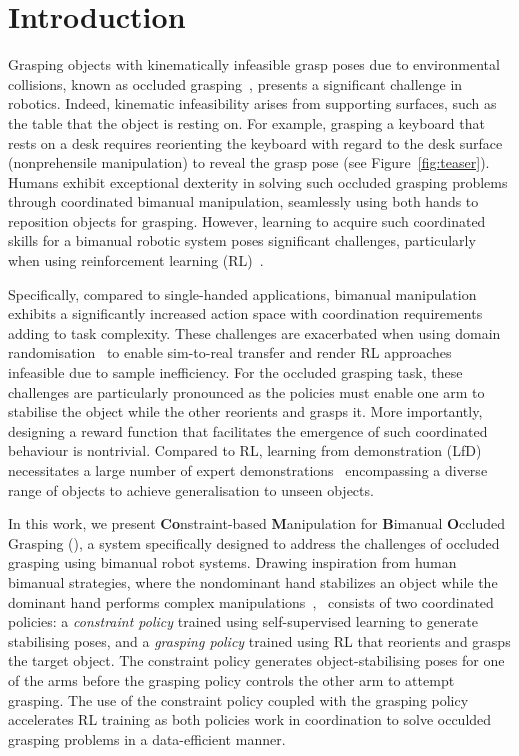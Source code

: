 \section{Introduction}
Grasping objects with kinematically infeasible grasp poses due to environmental collisions, known as occluded grasping~\cite{zhan2022learning},  presents a significant challenge in robotics.
Indeed, kinematic infeasibility arises from supporting surfaces, such as the table that the object is resting on.
For example, grasping a keyboard that rests on a desk requires reorienting the keyboard with regard to the desk surface (nonprehensile manipulation) to reveal the grasp pose (see Figure~\ref{fig:teaser}). 
Humans exhibit exceptional dexterity in solving such occluded grasping problems through coordinated bimanual manipulation, seamlessly using both hands to reposition objects for grasping.
However, learning to acquire such coordinated skills for a bimanual robotic system poses significant challenges, particularly when using reinforcement learning (RL)~\cite{schulman2017proximalpolicyoptimizationalgorithms, haarnoja2018soft}.

Specifically, compared to single-handed applications, bimanual manipulation exhibits a significantly increased action space with coordination requirements adding to task complexity. These challenges are exacerbated when using domain randomisation~\cite{tobin2017domain} to enable sim-to-real transfer and render RL approaches infeasible due to sample inefficiency.
For the occluded grasping task, these challenges are particularly pronounced as the policies must enable one arm to stabilise the object while the other reorients and grasps it.
More importantly, designing a reward function that facilitates the emergence of such coordinated behaviour is nontrivial.
Compared to RL, learning from demonstration (LfD) necessitates a large number of expert demonstrations~\cite{zhao2024alohaunleashedsimplerecipe} encompassing a diverse range of objects to achieve generalisation to unseen objects. 


In this work, we present \textbf{Co}nstraint-based \textbf{M}anipulation
for \textbf{B}imanual \textbf{O}ccluded Grasping (\ourmethod), a system specifically designed to address the challenges of occluded grasping using bimanual robot systems.
Drawing inspiration from human bimanual strategies, where the nondominant hand stabilizes an object while the dominant hand performs complex manipulations~\cite{bagesteiro2002handedness, bagesteiro2003, drolet2024comparison}, \ourmethod~consists of two coordinated policies: a \textit{constraint policy} trained using self-supervised learning to generate stabilising poses, and a \textit{grasping policy} trained using RL that reorients and grasps the target object.
The constraint policy generates object-stabilising poses for one of the arms before the grasping policy controls the other arm to attempt grasping.
The use of the constraint policy coupled with the grasping policy accelerates RL training as both policies work in coordination to solve occulded grasping problems in a data-efficient manner.

